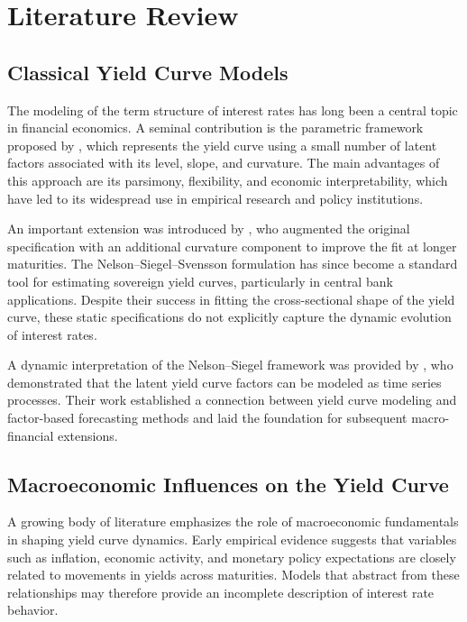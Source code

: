 \chapter{Literature Review}

\section{Classical Yield Curve Models}

The modeling of the term structure of interest rates has long been a central topic in financial
economics. A seminal contribution is the parametric framework proposed by
\textcite{nelson_siegel_1987}, which represents the yield curve using a small number of latent
factors associated with its level, slope, and curvature. The main advantages of this approach
are its parsimony, flexibility, and economic interpretability, which have led to its widespread
use in empirical research and policy institutions.

An important extension was introduced by \textcite{svensson_1994}, who augmented the
original specification with an additional curvature component to improve the fit at longer
maturities. The Nelson--Siegel--Svensson formulation has since become a standard tool for
estimating sovereign yield curves, particularly in central bank applications. Despite their
success in fitting the cross-sectional shape of the yield curve, these static specifications do
not explicitly capture the dynamic evolution of interest rates.

A dynamic interpretation of the Nelson--Siegel framework was provided by
\textcite{diebold_li_2006}, who demonstrated that the latent yield curve factors can be modeled
as time series processes. Their work established a connection between yield curve modeling
and factor-based forecasting methods and laid the foundation for subsequent macro-financial
extensions.

\section{Macroeconomic Influences on the Yield Curve}

A growing body of literature emphasizes the role of macroeconomic fundamentals in shaping
yield curve dynamics. Early empirical evidence suggests that variables such as inflation,
economic activity, and monetary policy expectations are closely related to movements in yields
across maturities. Models that abstract from these relationships may therefore provide an
incomplete description of interest rate behavior.

